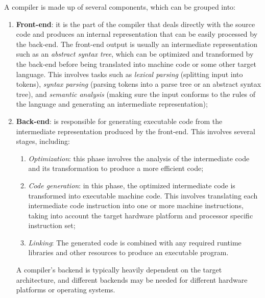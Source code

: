 A compiler is made up of several components, which can be grouped into:
\begin{enumerate}
  \item \textbf{Front-end}: it is the part of the compiler that deals directly with the source code and 
  produces an internal representation that can be easily processed by the back-end. The front-end output 
  is usually an intermediate representation such as an \textit{abstract syntax tree}, which can be 
  optimized and transformed by the back-end before being translated into machine code or some other target 
  language. This involves tasks such as \textit{lexical parsing} (splitting input into tokens), 
  \textit{syntax parsing} (parsing tokens into a parse tree or an abstract syntax tree), and 
  \textit{semantic analysis} (making sure the input conforms to the rules of the language and generating 
  an intermediate representation);
  \item \textbf{Back-end}: is responsible for generating executable code from the intermediate 
  representation produced by the front-end. This involves several stages, including:
  \begin{enumerate}
    \item \textit{Optimization}: this phase involves the analysis of the intermediate code and its 
    transformation to produce a more efficient code;
    \item \textit{Code generation}: in this phase, the optimized intermediate code is transformed into 
    executable machine code. This involves translating each intermediate code instruction into one or more 
    machine instructions, taking into account the target hardware platform and processor specific 
    instruction set;
    \item \textit{Linking}: The generated code is combined with any required runtime libraries and other 
    resources to produce an executable program.
  \end{enumerate}
  A compiler's backend is typically heavily dependent on the target architecture, and different backends 
  may be needed for different hardware platforms or operating systems.
\end{enumerate}

